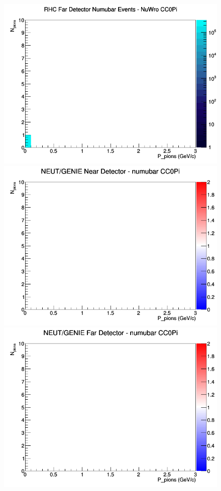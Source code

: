 \documentclass[12pt]{article}
\begin{document}
\begin{figure}[h]
\endminipage
{}
\includegraphics[width=\linewidth]{N_P/nominal/pions/CC0Pi_RHC_FD_numubar_N_P_NuWro.png}
\endminipage
\newline
{}
\includegraphics[width=\linewidth]{N_P/nominal/pions/ratios/CC0Pi_NEUT_GENIE_numubar_near_N_P.png}
\endminipage
{}
\includegraphics[width=\linewidth]{N_P/nominal/pions/ratios/CC0Pi_NEUT_GENIE_numubar_far_N_P.png}

\end{figure}
\end{document}
